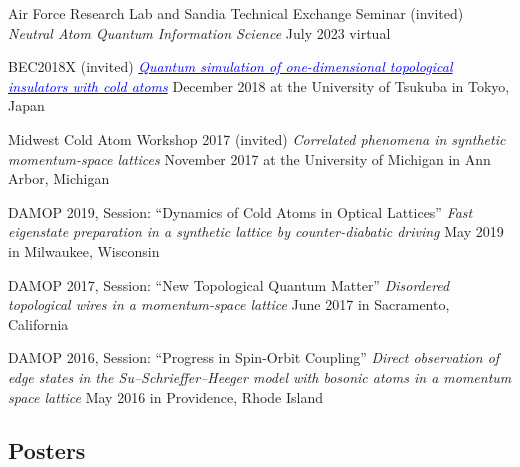 \documentclass[12pt,letterpaper,sans]{moderncv}
\newcommand*{\blink}[2]{\textit{\href{#1}{\textcolor{blue}{#2}}}}
\begin{document}
\begin{etaremune}[topsep=0pt,itemsep=4pt,partopsep=0pt,parsep=0pt]

\item Air Force Research Lab and Sandia Technical Exchange Seminar (invited)
\newline
\emph{Neutral Atom Quantum Information Science}
\newline
July 2023 virtual

\item BEC2018X (invited)
\newline 
\blink{http://thetis.ph.tsukuba.ac.jp/~hatsugai/modules/pico4/workshop2018x/meie.pdf}{Quantum simulation of one-dimensional topological insulators with cold atoms}
\newline 
December 2018 at the University of Tsukuba in Tokyo, Japan

\item Midwest Cold Atom Workshop 2017 (invited)
\newline 
\emph{Correlated phenomena in synthetic momentum-space lattices}
\newline 
November 2017 at the University of Michigan in Ann Arbor, Michigan

\item DAMOP 2019, Session: ``Dynamics of Cold Atoms in Optical Lattices''
\newline 
\emph{Fast eigenstate preparation in a synthetic lattice by counter-diabatic driving}
\newline 
May 2019 in Milwaukee, Wisconsin

\item DAMOP 2017, Session: ``New Topological Quantum Matter''
\newline 
\emph{Disordered topological wires in a momentum-space lattice}
\newline 
June 2017 in Sacramento, California

\item DAMOP 2016, Session: ``Progress in Spin-Orbit Coupling''
\newline 
\emph{Direct observation of edge states in the Su--Schrieffer--Heeger model with bosonic atoms in a momentum space lattice}
\newline 
May 2016 in Providence, Rhode Island

\end{etaremune}

\subsection{Posters}
\end{document}
